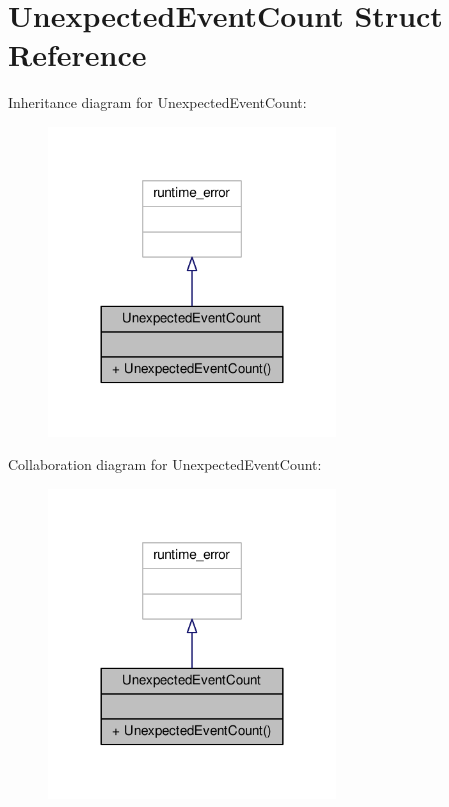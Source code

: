 \hypertarget{struct_unexpected_event_count}{}\section{Unexpected\+Event\+Count Struct Reference}
\label{struct_unexpected_event_count}


Inheritance diagram for Unexpected\+Event\+Count\+:
\nopagebreak
\begin{figure}[H]
\begin{center}
\leavevmode
\includegraphics[width=216pt]{struct_unexpected_event_count__inherit__graph}
\end{center}
\end{figure}


Collaboration diagram for Unexpected\+Event\+Count\+:
\nopagebreak
\begin{figure}[H]
\begin{center}
\leavevmode
\includegraphics[width=216pt]{struct_unexpected_event_count__coll__graph}
\end{center}
\end{figure}

